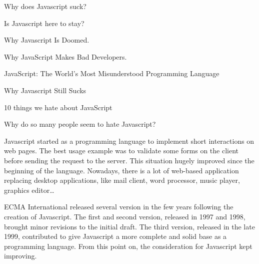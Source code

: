 {
\fontsize{10pt}{10pt}\selectfont
Why does Javascript suck?

Is Javascript here to stay?

Why Javascript Is Doomed.

Why JavaScript Makes Bad Developers.

JavaScript: The World's Most Misunderstood Programming Language

Why Javascript Still Sucks

10 things we hate about JavaScript

Why do so many people seem to hate Javascript?
}

Javascript started as a programming language to implement short interactions on web pages.
The best usage example was to validate some forms on the client before sending the request to the server.
This situation hugely improved since the beginning of the language.
Nowadays, there is a lot of web-based application replacing desktop applications, like mail client, word processor, music player, graphics editor…


ECMA International released several version in the few years following the creation of Javascript.
The first and second version, released in 1997 and 1998, brought minor revisions to the initial draft.
The third version, released in the late 1999, contributed to give Javascript a more complete and solid base as a programming language.
From this point on, the consideration for Javascript kept improving.

